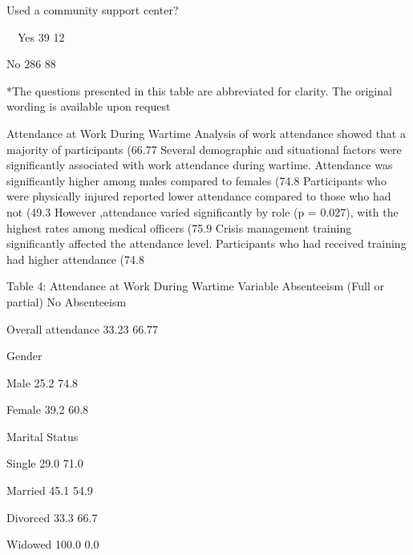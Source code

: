 Used a community support center?



 Yes
39
12%

    No
286
88%

*The questions presented in this table are abbreviated for clarity. The original wording is available upon request 

Attendance at Work During Wartime
Analysis of work attendance showed that a majority of participants (66.77%
Several demographic and situational factors were significantly associated with work attendance during wartime.
Attendance was significantly higher among males compared to females (74.8%
Participants who were physically injured reported lower attendance compared to those who had not (49.3%
However ,attendance varied significantly by role (p = 0.027), with the highest rates among medical officers (75.9%
Crisis management training significantly affected the attendance level. Participants who had received training had higher attendance (74.8%

Table 4: Attendance at Work During Wartime
Variable
Absenteeism (Full or partial) %
No Absenteeism %

Overall attendance
33.23%
66.77%

Gender



  Male
25.2%
74.8%

  Female
39.2%
60.8%

Marital Status



  Single
29.0%
71.0%

  Married
45.1%
54.9%

  Divorced
33.3%
66.7%

  Widowed
100.0%
0.0%

